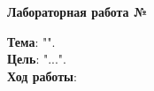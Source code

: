 \documentclass[12pt, a4paper, simple]{eskdtext}
\begin{document}
    \begin{ESKDtitlePage}
        
    \end{ESKDtitlePage}

    \begin{center}
        \textbf{Лабораторная работа №\titlePageLabNumber}\\
    \end{center}

    \textbf{Тема}: "\titlePageTopic".\\

    \textbf{Цель}: "...".\\

    \textbf{Ход работы}:

    

    
\end{document}
